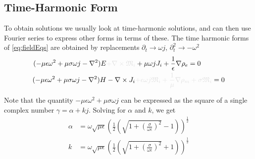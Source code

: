 \documentclass{article}
\numberwithin{equation}{section}
\begin{document}
\subsection{Time-Harmonic Form}
To obtain solutions we usually look at time-harmonic solutions, and can then use Fourier series to express other forms in terms of these. The time harmonic forms of \eqref{eq:fieldEqs} are obtained by replacements $\partial_t \to \omega j$, $\partial_t^2 \to - \omega^2$
\begin{subequations} \label{eq:fieldEqsTH}
    \begin{align}
    (- \mu \epsilon \omega^2 + \mu \sigma \omega j - \nabla^2 ) E & \begingroup \textcolor{vanish}{+ \nabla \times \mathfrak{M}_i} \endgroup + \mu \omega j J_i + \frac{1}{\epsilon} \nabla \rho_e = 0 \label{eq:electricFieldEqTH} \\
    (-\mu \epsilon \omega^2 + \mu \sigma \omega j - \nabla^2 ) H & - \nabla \times J_i \begingroup \textcolor{vanish}{+ \epsilon \omega j \mathfrak{M}_i + \frac{1}{\mu} \nabla \rho_m + \sigma \mathfrak{M}_i} \endgroup = 0 \label{eq:magneticFieldEqTH}
    \end{align}
\end{subequations}

Note that the quantity $- \mu \epsilon \omega^2 + \mu \sigma \omega j $ can be expressed as the square of a single complex number $\gamma = \alpha + kj$. Solving for $\alpha$ and $k$, we get
\begin{subequations}
\begin{align} \label{eq:attenuationConstant}
    \alpha &= \omega \sqrt{\mu \epsilon} \left( \frac{1}{2} \left( \sqrt{1 + \left( \frac{\sigma}{\omega \epsilon} \right)^2 } - 1 \right)  \right)^{\frac{1}{2}} \\
    k &= \omega \sqrt{\mu \epsilon} \left( \frac{1}{2} \left( \sqrt{1 + \left( \frac{\sigma}{\omega \epsilon} \right)^2 } + 1 \right)  \right)^{\frac{1}{2}} \label{eq:wavenumber}
\end{align}
\end{subequations}
\end{document}
